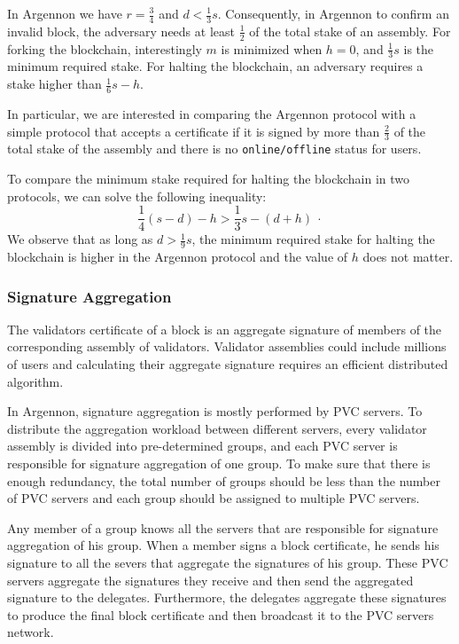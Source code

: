 In Argennon we have $r=\frac{3}{4}$ and $d < \frac{1}{3}s$.
Consequently, in Argennon to confirm an invalid block, the adversary needs at least $\frac{1}{2}$ of the total stake
of an assembly. For forking the blockchain, interestingly $m$ is
minimized when $h=0$, and $\frac{1}{3}s$ is the minimum required stake. For halting the blockchain,
an adversary requires a stake higher than $\frac{1}{6}s-h$.

In particular, we are interested in comparing the Argennon protocol with a simple protocol that accepts a certificate
if it is signed by more than $\frac{2}{3}$ of the total stake of the assembly and there is no \texttt{online/offline}
status for users.

To compare the minimum stake required for halting the blockchain in two protocols, we can solve the following
inequality:
\[
    \frac{1}{4}(s-d)-h > \frac{1}{3}s-(d+h)\ \cdot
\]
We observe that as long as $d>\frac{1}{9}s$, the minimum required stake for halting the blockchain is higher in the
Argennon protocol and the value of $h$ does not matter.

\subsubsection{Signature Aggregation}\label{subsubsec:sig-agg}

The validators certificate of a block is an aggregate signature of members of the corresponding assembly of
validators. Validator assemblies could include millions of users and calculating their aggregate
signature requires an efficient distributed algorithm.

In Argennon, signature aggregation is mostly performed by PVC servers. To distribute the aggregation workload
between different servers, every validator assembly is divided into pre-determined groups, and each PVC
server is responsible for signature aggregation of one group. To make sure that there is enough redundancy, the
total number of groups should be less than the number of PVC servers and each group should be assigned to
multiple PVC servers.

Any member of a group knows all the servers that are responsible for signature aggregation of his group. When a member
signs a block certificate, he sends his signature to all the severs that aggregate the signatures of his group.
These PVC servers aggregate the signatures they receive and then send the aggregated signature to the delegates.
Furthermore, the delegates aggregate these signatures to produce the final block certificate
and then broadcast it to the PVC servers network.


